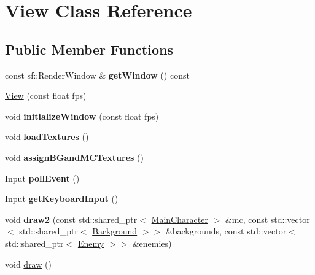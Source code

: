 \hypertarget{class_view}{}\section{View Class Reference}
\label{class_view}
\subsection*{Public Member Functions}
\begin{DoxyCompactItemize}
\item 
\mbox{\label{class_view_aa8b502dd59a99ba0ec5c961b099cd443}} 
const sf\+::\+Render\+Window \& {\bfseries get\+Window} () const
\item 
\hyperlink{class_view_a11dfb2fbc3e20eb48c96b8e8a20687cb}{View} (const float fps)
\item 
\mbox{\label{class_view_a810ac2903e9bdbdcd3d92b677fc0e7e0}} 
void {\bfseries initialize\+Window} (const float fps)
\item 
\mbox{\label{class_view_af3b02b172b87fc315a98ce00f86074d4}} 
void {\bfseries load\+Textures} ()
\item 
\mbox{\label{class_view_ab94417a6b73c205cece8432b7ab4458a}} 
void {\bfseries assign\+B\+Gand\+M\+C\+Textures} ()
\item 
\mbox{\label{class_view_a0a285a78bd5d06cbef88dcbd0ad9a022}} 
Input {\bfseries poll\+Event} ()
\item 
\mbox{\label{class_view_ae8d33c17a56173d3ef8f6ab47a1568d7}} 
Input {\bfseries get\+Keyboard\+Input} ()
\item 
\mbox{\label{class_view_a30af1accdfddafd1318d301092934d67}} 
void {\bfseries draw2} (const std\+::shared\+\_\+ptr$<$ \hyperlink{class_main_character}{Main\+Character} $>$ \&mc, const std\+::vector$<$ std\+::shared\+\_\+ptr$<$ \hyperlink{class_background}{Background} $>$$>$ \&backgrounds, const std\+::vector$<$ std\+::shared\+\_\+ptr$<$ \hyperlink{class_enemy}{Enemy} $>$$>$ \&enemies)
\item 
void \hyperlink{class_view_ad26b8f3c6e07b3a8292ad508c5d081b5}{draw} ()
\end{DoxyCompactItemize}


